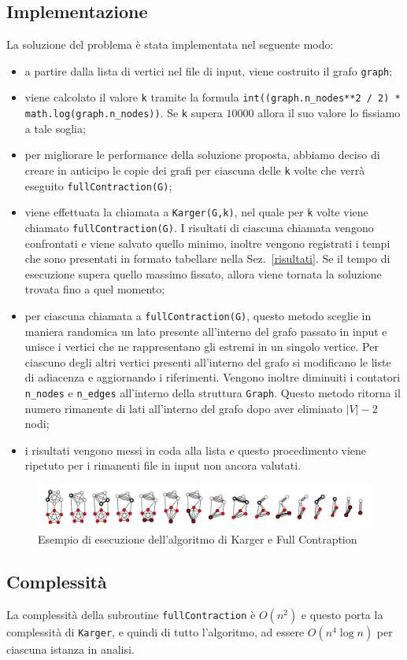 \subsection{Implementazione}
	
	La soluzione del problema è stata implementata nel seguente modo:
	\begin{itemize}
		\item a partire dalla lista di vertici nel file di input, viene costruito il grafo \texttt{graph};
		\item viene calcolato il valore \texttt{k} tramite la formula \texttt{int((graph.n\_nodes**2 / 2) * \\
			math.log(graph.n\_nodes))}. Se \texttt{k} supera $10000$ allora il suo valore lo fissiamo a tale soglia;
		\item per migliorare le performance della soluzione proposta, abbiamo deciso di creare in anticipo le copie dei grafi per ciascuna delle \texttt{k} volte che verrà eseguito \texttt{fullContraction(G)};
		\item viene effettuata la chiamata a \texttt{Karger(G,k)}, nel quale per \texttt{k} volte viene chiamato \texttt{fullContraction(G)}. I risultati di ciascuna chiamata vengono confrontati e viene salvato quello minimo, inoltre vengono registrati i tempi che sono presentati in formato tabellare nella Sez.~\ref{risultati}. Se il tempo di esecuzione supera quello massimo fissato, allora viene tornata la soluzione trovata fino a quel momento;
		\item per ciascuna chiamata a \texttt{fullContraction(G)}, questo metodo sceglie in maniera randomica un lato presente all'interno del grafo passato in input e unisce i vertici che ne rappresentano gli estremi in un singolo vertice. Per ciascuno degli altri vertici presenti all'interno del grafo si modificano le liste di adiacenza e aggiornando i riferimenti. Vengono inoltre diminuiti i contatori \texttt{n\_nodes} e \texttt{n\_edges} all'interno della struttura \texttt{Graph}. Questo metodo ritorna il numero rimanente di lati all'interno del grafo dopo aver eliminato $|V|-2$ nodi;
		\item i risultati vengono messi in coda alla lista e questo procedimento viene ripetuto per i rimanenti file in input non ancora valutati.
	\end{itemize}

	\vspace{1cm}
	\begin{center}
		\begin{figure}[H]
			\centering
			\includegraphics[width=\linewidth]{Img/example_1.png}
			\caption{Esempio di esecuzione dell'algoritmo di Karger e Full Contraption}
		\end{figure}
	\end{center}
	\vspace{-1cm}
		
\subsection{Complessità}

	La complessità della subroutine \texttt{fullContraction} è $O(n^2)$ e questo porta la complessità di \texttt{Karger}, e quindi di tutto l'algoritmo, ad essere $O(n^4\log n)$ per ciascuna istanza in analisi.
	
\pagebreak
